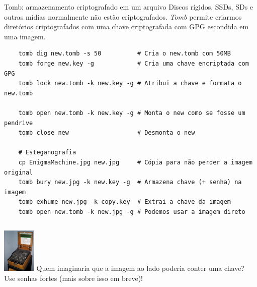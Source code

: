 \documentclass[utf8]{beamer}
\begin{document}
\begin{frame}[fragile]{Tomb: armazenamento criptografado em um arquivo}
  Discos rígidos, SSDs, SDs e outras mídias
  normalmente não estão criptografados.
  \emph{Tomb} permite criarmos diretórios criptografados
  com uma chave criptografada com GPG escondida em uma imagem.
  \vfill
  \begin{verbatim}
    tomb dig new.tomb -s 50          # Cria o new.tomb com 50MB
    tomb forge new.key -g            # Cria uma chave encriptada com GPG
    tomb lock new.tomb -k new.key -g # Atribui a chave e formata o new.tomb

    tomb open new.tomb -k new.key -g # Monta o new como se fosse um pendrive
    tomb close new                   # Desmonta o new

    # Esteganografia
    cp EnigmaMachine.jpg new.jpg     # Cópia para não perder a imagem original
    tomb bury new.jpg -k new.key -g  # Armazena chave (+ senha) na imagem
    tomb exhume new.jpg -k copy.key  # Extrai a chave da imagem
    tomb open new.tomb -k new.jpg -g # Podemos usar a imagem direto
  \end{verbatim}
  \vfill
  \begin{columns}[c]
    \includegraphics[height=60pt]{EnigmaMachine.jpg}
    \centering
    Quem imaginaria que a imagem ao lado poderia conter uma chave?
    \vfill
    Use senhas fortes (mais sobre isso em breve)!
  \end{columns}
\end{frame}
\end{document}
